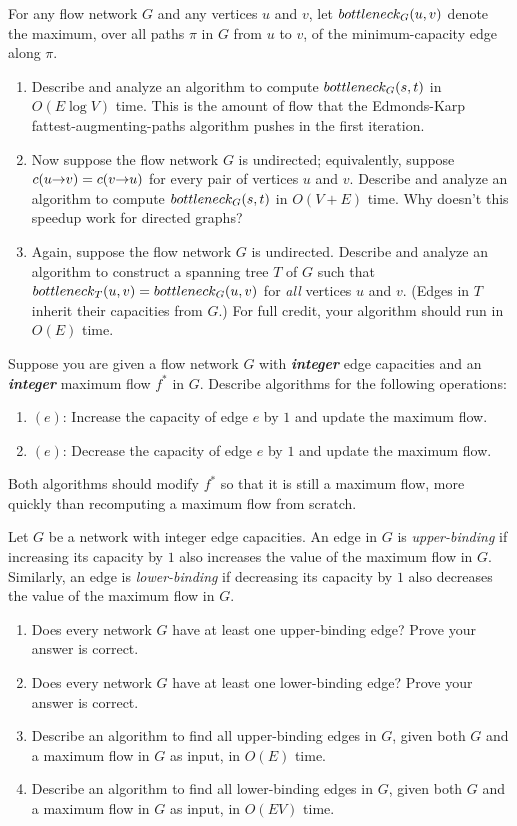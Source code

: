 \begin{exercises}
\item For any flow network $G$ and any vertices $u$ and $v$, let $bottleneck_G(u,v)$ denote the maximum, over all paths $\pi$ in $G$ from $u$ to $v$, of the minimum-capacity edge along $\pi$.
\begin{enumerate}
\item Describe and analyze an algorithm to compute $bottleneck_G(s,t)$ in $O(E \log V)$ time.
This is the amount of flow that the Edmonds-Karp fattest-augmenting-paths algorithm pushes in the first iteration.
\item Now suppose the flow network $G$ is undirected; equivalently, suppose $c(u\mathord{\rightarrow}v) = c(v\mathord{\rightarrow}u)$ for every pair of vertices $u$ and $v$.
Describe and analyze an algorithm to compute $bottleneck_G(s,t)$ in $O(V+E)$ time.
Why doesn’t this speedup work for directed graphs?
\item {} Again, suppose the flow network $G$ is undirected.
Describe and analyze an algorithm to construct a spanning tree $T$ of $G$ such that $bottleneck_T(u,v) = bottleneck_G(u,v)$ for \textit{all} vertices $u$ and $v$.
(Edges in $T$ inherit their capacities from $G$.)
For full credit, your algorithm should run in $O(E)$ time.
\end{enumerate}

\item Suppose you are given a flow network $G$ with \textbf{\textit{integer}} edge capacities and an \textbf{\textit{integer}} maximum flow $f^*$ in $G$.
Describe algorithms for the following operations:
\begin{enumerate}
\item {}$(e)$: Increase the capacity of edge $e$ by $1$ and update the maximum flow.
\item {}$(e)$: Decrease the capacity of edge $e$ by $1$ and update the maximum flow.
\end{enumerate}
Both algorithms should modify $f^*$ so that it is still a maximum flow, more quickly than recomputing a maximum flow from scratch.

\item Let $G$ be a network with integer edge capacities.
An edge in $G$ is \textit{upper-binding} if increasing its capacity by $1$ also increases the value of the maximum flow in $G$.
Similarly, an edge is \textit{lower-binding} if decreasing its capacity by $1$ also decreases the value of the maximum flow in $G$.
\begin{enumerate}
\item Does every network $G$ have at least one upper-binding edge? Prove your answer is correct.
\item Does every network $G$ have at least one lower-binding edge? Prove your answer is correct.
\item Describe an algorithm to find all upper-binding edges in $G$, given both $G$ and a maximum flow in $G$ as input, in $O(E)$ time.
\item Describe an algorithm to find all lower-binding edges in $G$, given both $G$ and a maximum flow in $G$ as input, in $O(EV)$ time.
\end{enumerate}


\end{exercises}
